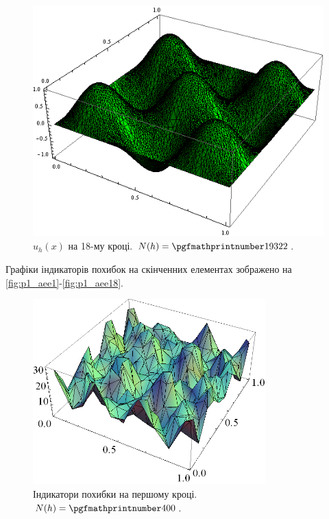 \begin{figure}[H]
	\centering
    \includegraphics[width=\textwidth]{problem1/my/solutions/18}
    \caption{$u_h(x)$ на 18-му кроці. $N(h) = \nn{19322}$.}
    \label{fig:p1_solution18}
\end{figure}
%
\clearpage
Графіки індикаторів похибок на скінченних елементах зображено на \autoref{fig:p1_aee1}-\ref{fig:p1_aee18}.
%
\begin{figure}[H]
	\centering
    \includegraphics[width=0.8\textwidth]{problem1/my/AEE/1}
    \caption{Індикатори похибки на першому кроці.  $N(h) = \nn{400}$.}
    \label{fig:p1_aee1}
\end{figure}

